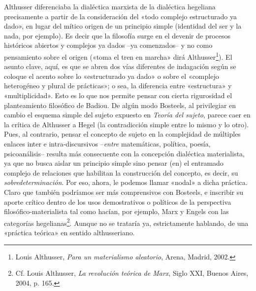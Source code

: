 Althusser diferenciaba la dialéctica marxista de la dialéctica hegeliana precisamente a partir de la consideración del «todo complejo estructurado ya dado», en lugar del mítico origen de un principio simple (identidad del ser y la nada, por ejemplo). Es decir que la filosofía surge en el devenir de procesos históricos abiertos y complejos ya dados --ya comenzados-- y no como pensamiento sobre el origen («toma el tren en marcha» dirá Althusser\footnote{Louis Althusser, \emph{Para un materialismo aleatorio}, Arena, Madrid, 2002.}). El asunto clave, aquí, es que se abren dos vías diferentes de indagación según se coloque el acento sobre lo «estructurado ya dado» o sobre el «complejo heterogéneo y plural de prácticas»; o sea, la diferencia entre «estructura» y «multiplicidad». Esto es lo que nos permite pensar con cierta rigurosidad el planteamiento filosófico de Badiou. De algún modo Bosteels, al privilegiar en cambio el esquema simple del sujeto expuesto en \emph{Teoría del sujeto}, parece caer en la crítica de Althusser a Hegel (la contradicción simple entre lo mismo y lo otro). Pues, al contrario, pensar el concepto de sujeto en la complejidad de múltiples enlaces inter e intra-discursivos --\emph{entre} matemáticas, política, poesía, psicoanálisis-- resulta más consecuente con la concepción dialéctica materialista, ya que no busca aislar un principio simple sino pensar (en) el entramado complejo de relaciones que habilitan la construcción del concepto, es decir, su \emph{sobredeterminación}. Por eso, ahora, le podemos llamar «nodal» a dicha práctica. Claro que también podríamos ser más comprensivos con Bosteels, e inscribir su aporte crítico dentro de los usos demostrativos o políticos de la perspectiva filosófico-materialista tal como hacían, por ejemplo, Marx y Engels con las categorías hegelianas\footnote{Cf. Louis Althusser, \emph{La revolución teórica de Marx}, Siglo XXI, Buenos Aires, 2004, p. 165.}. Aunque no se trataría ya, estrictamente hablando, de una «práctica teórica» en sentido althusseriano.

